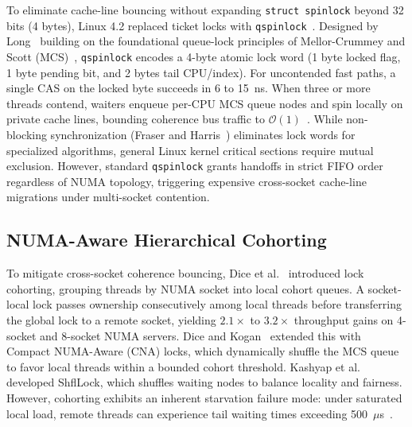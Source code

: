 \documentclass[conference]{IEEEtran}
\begin{document}
To eliminate cache-line bouncing without expanding \texttt{struct spinlock} beyond 32 bits (4 bytes), Linux 4.2 replaced ticket locks with \texttt{qspinlock}~\cite{long2014qspinlock}. Designed by Long~\cite{long2014qspinlock} building on the foundational queue-lock principles of Mellor-Crummey and Scott (MCS)~\cite{mellor1991algorithms,herlihy2020art}, \texttt{qspinlock} encodes a 4-byte atomic lock word (1 byte locked flag, 1 byte pending bit, and 2 bytes tail CPU/index). For uncontended fast paths, a single CAS on the locked byte succeeds in 6 to 15~ns. When three or more threads contend, waiters enqueue per-CPU MCS queue nodes and spin locally on private cache lines, bounding coherence bus traffic to $\mathcal{O}(1)$~\cite{cho2022survey,long2014qspinlock}. While non-blocking synchronization (Fraser and Harris~\cite{fraser2007concurrent}) eliminates lock words for specialized algorithms, general Linux kernel critical sections require mutual exclusion. However, standard \texttt{qspinlock} grants handoffs in strict FIFO order regardless of NUMA topology, triggering expensive cross-socket cache-line migrations under multi-socket contention.

\subsection{NUMA-Aware Hierarchical Cohorting}
To mitigate cross-socket coherence bouncing, Dice et al.~\cite{dice2012lock} introduced lock cohorting, grouping threads by NUMA socket into local cohort queues. A socket-local lock passes ownership consecutively among local threads before transferring the global lock to a remote socket, yielding $2.1\times$ to $3.2\times$ throughput gains on 4-socket and 8-socket NUMA servers. Dice and Kogan~\cite{dice2019cna} extended this with Compact NUMA-Aware (CNA) locks, which dynamically shuffle the MCS queue to favor local threads within a bounded cohort threshold. Kashyap et al.~\cite{kashyap2019shfllock} developed ShflLock, which shuffles waiting nodes to balance locality and fairness. However, cohorting exhibits an inherent starvation failure mode: under saturated local load, remote threads can experience tail waiting times exceeding 500~$\mu$s~\cite{guiroux2016multicore,dice2012lock}.
\end{document}

